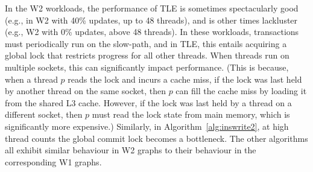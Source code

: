 In the W2 workloads, the performance of TLE is sometimes spectacularly good (e.g., in W2 with 40\% updates, up to 48 threads), and is other times lackluster (e.g., W2 with 0\% updates, above 48 threads).
In these workloads, transactions must periodically run on the slow-path, and in TLE, 
this entails acquiring a global lock that restricts progress for all other threads.
When threads run on multiple sockets, this can significantly impact performance.
(This is because, when a thread $p$ reads the lock and incurs a cache miss, 
if the lock was last held by another thread on the same socket, 
then $p$ can fill the cache miss by loading it from the shared L3 cache.
However, if the lock was last held by a thread on a different socket, 
then $p$ must read the lock state from main memory, which is significantly more expensive.)
Similarly, in Algorithm~\ref{alg:inswrite2}, at high thread counts the global commit lock becomes a bottleneck.
The other algorithms all exhibit similar behaviour in W2 graphs to their behaviour in the corresponding W1 graphs.
%

